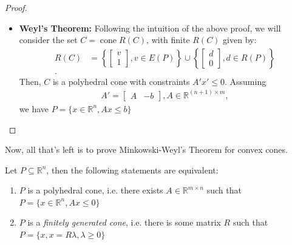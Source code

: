 \begin{proof}
\begin{itemize}
  \item \textbf{Weyl's Theorem:}
    Following the intuition of the above proof, we will consider the set
    \( C = \operatorname{cone} R(C) \), with finite \( R(C) \) given by:
    \begin{align*}
      R(C) &= \left\{ \begin{bmatrix} v \\ 1 \end{bmatrix} , v \in E(P) \right\}
      \cup \left\{ \begin{bmatrix} d \\ 0 \end{bmatrix} , d \in R(P) \right\}  \\
    .\end{align*}
    Then, \( C \) is a polyhedral cone with constraints \( A'x' \le  0 \).
    Assuming
    \begin{align*}
      A' = \begin{bmatrix} A & -b \end{bmatrix}, A \in \mathbb{R}^{(n + 1)
      \times  m}
    ,\end{align*}we have \( P = \{x \in \mathbb{R}^{n}, Ax \le  b\}   \)
  \end{itemize}
\end{proof}

Now, all that's left is to prove Minkowski-Weyl's Theorem for convex cones.

\begin{theorem}
\label{thr:Minkowski-Weyl's Theorem for Convex Cones}
  Let \( P \subseteq \mathbb{R}^{n} \), then the following statements are
  equivalent:

  \begin{enumerate}
  \item \( P \) is a polyhedral cone, i.e. there exists \( A \in \mathbb{R}^{m
    \times  n} \) such that \( P = \{x \in \mathbb{R}^{n}, Ax \le  0\}   \)
  \item \( P \) is a \textit{finitely generated cone}, i.e. there is some matrix
    \( R \) such that \( P = \{x, x = R\lambda, \lambda \ge  0\}   \)
  \end{enumerate}
\end{theorem}

